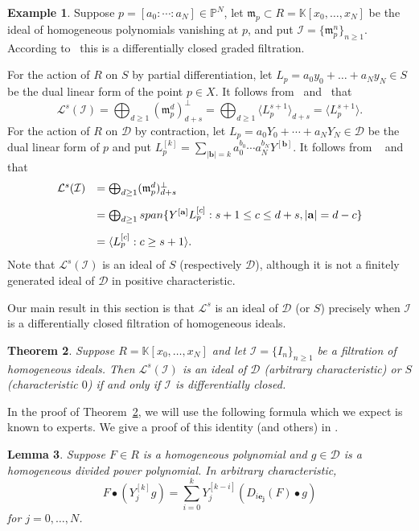 \documentclass[12pt, reqno]{amsart}
\numberwithin{equation}{section}
\newcommand{\ba}{\mathbf{a}}
\newcommand{\bb}{\mathbf{b}}
\newcommand{\fm}{{\mathfrak m}}
\renewcommand{\P}{{\mathbb P}}
\newcommand{\kk}{\mathbb{K}}
\newcommand{\contract}{\bullet}
\newcommand{\cL}{{\mathcal L}}
\newcommand{\I}{{\mathcal I}}
\theoremstyle{plain} %
\newtheorem{thm}{Theorem}[section]
\newtheorem{lem}[thm]{Lemma}
\theoremstyle{definition}
\newtheorem{ex}[thm]{Example}
\theoremstyle{remark}
\begin{document}
\begin{ex}\label{ex:LsForPointIdeals}
	Suppose $p=[a_0:\cdots:a_N]\in\P^N$, let $\fm_p\subset R=\kk[x_0,\ldots,x_N]$ be the ideal of homogeneous polynomials vanishing at $p$, and put $\I=\{\fm_p^n\}_{n\ge 1}$.  According to~ this is a differentially closed graded filtration.
	
	For the action of $R$ on $S$ by partial differentiation, let $L_p=a_0y_0+\ldots+a_Ny_N\in S$ be the dual linear form of the point $p\in X$.  It follows from~ and~ that 
	\[
	\cL^s(\I)=\bigoplus_{d\ge 1} (\fm_p^d)^\perp_{d+s}=\bigoplus_{d\ge 1} \langle L_p^{s+1}\rangle_{d+s}=\langle L_p^{s+1} \rangle.
	\]
	For the action of $R$ on $\mathcal{D}$ by contraction, let $L_p=a_0Y_0+\cdots+a_NY_N\in\mathcal{D}$ be the dual linear form of $p$ and put $L^{[k]}_p=\sum_{|\bb|=k} a_0^{b_0}\cdots a_N^{b_N} Y^{[\bb]}$.  It follows from ~ and~ that
	\[
	\begin{array}{rl}
		\cL^s(\I) & =\bigoplus_{d\ge 1} (\fm_p^d)^\perp_{d+s}\\[10 pt]
		&=\bigoplus_{d\ge 1} {\rm span}\{ Y^{[\ba]}L_p^{[c]}: s+1\le c \le d+s, |\ba|=d-c \}\\[10 pt]
		&=\langle L_p^{[c]}: c\ge s+1\rangle.
	\end{array}
	\]
	Note that $\cL^s(\I)$ is an ideal of $S$ (respectively $\mathcal{D}$), although it is not a finitely generated ideal of $\mathcal{D}$ in positive characteristic.
\end{ex}

Our main result in this section is that $\cL^s$ is an ideal of $\mathcal{D}$ (or $S$) precisely when $\I$ is a differentially closed filtration of homogeneous ideals.

\begin{thm}\label{thm:differentiallyclosed}
Suppose $R=\kk[x_0,\ldots,x_N]$ and let $\I=\{I_n\}_{n\ge 1}$ be a filtration of homogeneous ideals.  Then $\cL^s(\I)$ is an ideal of $\mathcal{D}$ (arbitrary characteristic) or $S$ (characteristic $0$) if and only if $\I$ is differentially closed.
\end{thm}

In the proof of Theorem~\ref{thm:differentiallyclosed}, we will use the following formula which we expect is known to experts.  We give a proof of this identity (and others) in .

\begin{lem}\label{lem:prodrule}
Suppose $F\in R$ is a homogeneous polynomial and $g\in \mathcal{D}$ is a homogeneous divided power polynomial.  In arbitrary characteristic,
\[
F\contract(Y^{[k]}_jg)=\sum_{i=0}^k Y_j^{[k-i]}(D_{i\mathbf{e_j}}(F)\contract g)
\]
for $j=0,\ldots,N$.
\end{lem}
\end{document}
